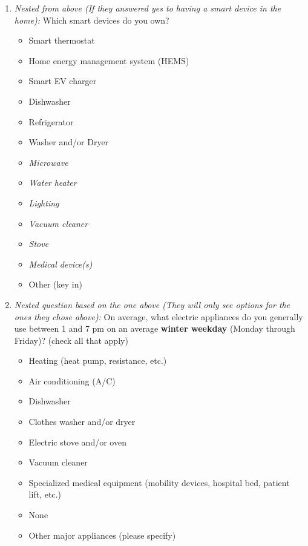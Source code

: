 \documentclass{article}
\begin{document}
\begin{enumerate}
\item \textit{Nested from above (If they answered yes to having a smart device in the home):}
Which smart devices do you own?
\begin{itemize}
  \item[\checkbox] Smart thermostat
  \item[\checkbox] Home energy management system (HEMS)
  \item[\checkbox] Smart EV charger
  \item[\checkbox] Dishwasher
  \item[\checkbox] Refrigerator
  \item[\checkbox] Washer and/or Dryer
  \item[\checkbox] \textit{Microwave}
  \item[\checkbox] \textit{Water heater}
  \item[\checkbox] \textit{Lighting}
  \item[\checkbox] \textit{Vacuum cleaner}
  \item[\checkbox] \textit{Stove}
  \item[\checkbox] \textit{Medical device(s)}
  \item[\checkbox] Other (key in)
\end{itemize}
 

\item \textit{Nested question based on the one above (They will only see options for the ones they chose above):}
On average, what electric appliances do you generally use between 1 and 7 pm on an average \textbf{winter weekday} (Monday through Friday)? (check all that apply)
\begin{itemize}
  \item[\checkbox] Heating (heat pump, resistance, etc.)
  \item[\checkbox] Air conditioning (A/C)
  \item[\checkbox] Dishwasher
  \item[\checkbox] Clothes washer and/or dryer
  \item[\checkbox] Electric stove and/or oven
  \item[\checkbox] Vacuum cleaner
  \item[\checkbox] Specialized medical equipment (mobility devices, hospital bed, patient lift, etc.)
  \item[\checkbox] None
  \item[\checkbox] Other major appliances (please specify)
\end{itemize}
 


\end{enumerate}
\end{document}
